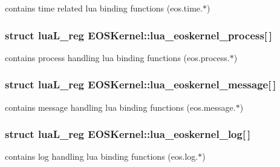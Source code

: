 contains time related lua binding functions (eos.time.$\ast$) 

\hypertarget{structEOSKernel_077213f420729c5a87f04c29fd14ce21}{
\subsubsection[{lua\_\-eoskernel\_\-process}]{\setlength{\rightskip}{0pt plus 5cm}struct luaL\_\-reg {\bf EOSKernel::lua\_\-eoskernel\_\-process}\mbox{[}$\,$\mbox{]}}}
\label{structEOSKernel_077213f420729c5a87f04c29fd14ce21}


contains process handling lua binding functions (eos.process.$\ast$) 

\hypertarget{structEOSKernel_7033fb8fd34a75b851d9d9958e38c8f1}{
\subsubsection[{lua\_\-eoskernel\_\-message}]{\setlength{\rightskip}{0pt plus 5cm}struct luaL\_\-reg {\bf EOSKernel::lua\_\-eoskernel\_\-message}\mbox{[}$\,$\mbox{]}}}
\label{structEOSKernel_7033fb8fd34a75b851d9d9958e38c8f1}


contains message handling lua binding functions (eos.message.$\ast$) 

\hypertarget{structEOSKernel_ed8c742384718b2e595d4f800178f80a}{
\subsubsection[{lua\_\-eoskernel\_\-log}]{\setlength{\rightskip}{0pt plus 5cm}struct luaL\_\-reg {\bf EOSKernel::lua\_\-eoskernel\_\-log}\mbox{[}$\,$\mbox{]}}}
\label{structEOSKernel_ed8c742384718b2e595d4f800178f80a}


contains log handling lua binding functions (eos.log.$\ast$) 

